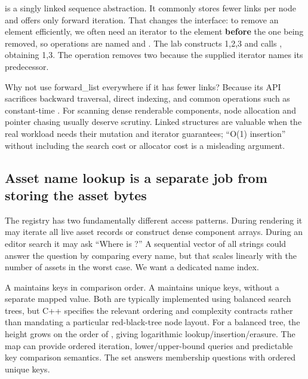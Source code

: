  is a singly linked sequence abstraction. It commonly stores fewer links per node and offers only forward iteration. That changes the interface: to remove an element efficiently, we often need an iterator to the element \textbf{before} the one being removed, so operations are named  and . The lab constructs 1,2,3 and calls , obtaining 1,3. The operation removes two because the supplied iterator names its predecessor.

Why not use forward\_list everywhere if it has fewer links? Because its API sacrifices backward traversal, direct indexing, and common operations such as constant-time . For scanning dense renderable components, node allocation and pointer chasing usually deserve scrutiny. Linked structures are valuable when the real workload needs their mutation and iterator guarantees; ``O(1) insertion'' without including the search cost or allocator cost is a misleading argument.

\subsection{Asset name lookup is a separate job from storing the asset bytes}\label{01-foundations-i-ch006-asset-name-lookup-is-a-separate-job-from-storing-the-asset-bytes}

\hypertarget{01-foundations-i-ch006-asset-name-lookup-is-a-separate-job-from-storing-the-asset-bytes}{}

The registry has two fundamentally different access patterns. During rendering it may iterate all live asset records or construct dense component arrays. During an editor search it may ask ``Where is ?'' A sequential vector of all strings could answer the question by comparing every name, but that scales linearly with the number of assets in the worst case. We want a dedicated name index.

A  maintains keys in comparison order. A  maintains unique keys, without a separate mapped value. Both are typically implemented using balanced search trees, but C++ specifies the relevant ordering and complexity contracts rather than mandating a particular red-black-tree node layout. For a balanced tree, the height grows on the order of , giving logarithmic lookup/insertion/erasure. The map can provide ordered iteration, lower/upper-bound queries and predictable key comparison semantics. The set answers membership questions with ordered unique keys.


